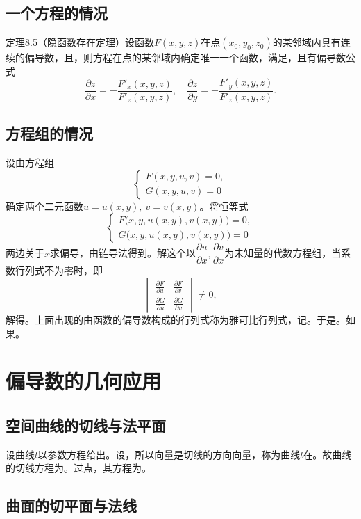 \subsection{一个方程的情况}

定理8.5（隐函数存在定理）\quad 设函数$F(x,y,z)$在点$(x_0,y_0,z_0)$的某邻域内具有连续的偏导数，且，则方程在点的某邻域内确定唯一一个函数，满足，且有偏导数公式
\[
\frac{\partial z}{\partial x}=-\frac{F'_x(x,y,z)}{F'_z(x,y,z)},\quad
\frac{\partial z}{\partial y}=-\frac{F'_y(x,y,z)}{F'_z(x,y,z)}.
\]

\subsection{方程组的情况}

设由方程组
\[
\begin{cases}
F(x,y,u,v)=0,\\
G(x,y,u,v)=0
\end{cases}
\]
确定两个二元函数$u=u(x,y),\ v=v(x,y)$。将恒等式
\[
\begin{cases}
F\bigl(x,y,u(x,y),v(x,y)\bigr)=0,\\
G\bigl(x,y,u(x,y),v(x,y)\bigr)=0
\end{cases}
\]
两边关于$x$求偏导，由链导法得到。解这个以$\dfrac{\partial u}{\partial x},\dfrac{\partial v}{\partial x}$为未知量的代数方程组，当系数行列式不为零时，即
\[
\begin{vmatrix}
\frac{\partial F}{\partial u} & \frac{\partial F}{\partial v}\\[4pt]
\frac{\partial G}{\partial u} & \frac{\partial G}{\partial v}
\end{vmatrix}\neq 0,
\]
解得。上面出现的由函数的偏导数构成的行列式称为雅可比行列式，记。于是。如果。

\section{偏导数的几何应用}
\subsection{空间曲线的切线与法平面}

设曲线$l$以参数方程给出。设，所以向量是切线的方向向量，称为曲线$l$在。故曲线的切线方程为。过点，其方程为。

\subsection{曲面的切平面与法线}

